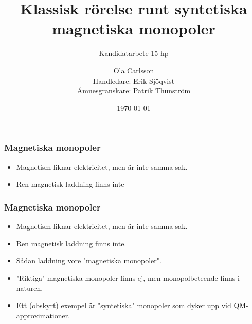 \documentclass[aspectratio=169]{beamer}
\author[Ola Carlsson]{Ola Carlsson \\ Handledare: Erik
Sjöqvist \\ Ämnesgranskare: Patrik Thunström}
\title{Klassisk rörelse runt syntetiska
        magnetiska monopoler}
\subtitle{Kandidatarbete 15 hp}
\date[\today]{\today}
\institute[Institutionen för fysik och
astronomi]{Institutionen för fysik och astronomi,
Avdelningen för Materialteori}
\begin{document}
\begin{frame}[plain]
  \titlepage
\end{frame}
\begin{frame}
  \frametitle{Magnetiska monopoler}
  \begin{itemize}
          \item Magnetism liknar elektricitet, men är
                  inte samma sak.
          \item Ren magnetisk laddning finns inte
  \end{itemize}
\end{frame}
\begin{frame}
        \begin{figure}[h]
                \centering
        \end{figure}
\end{frame}
\begin{frame}
  \frametitle{Magnetiska monopoler}
  \begin{itemize}
          \item Magnetism liknar elektricitet, men är
                  inte samma sak.
          \item Ren magnetisk laddning finns inte.
          \item Sådan laddning vore 
                  "magnetiska monopoler".
          \item "Riktiga" magnetiska monopoler finns ej,
                  men monopolbeteende finns i naturen.
          \item Ett (obskyrt) exempel är "syntetiska"
                  monopoler som dyker upp vid
                  QM-approximationer.
  \end{itemize}
\end{frame}
\end{document}
